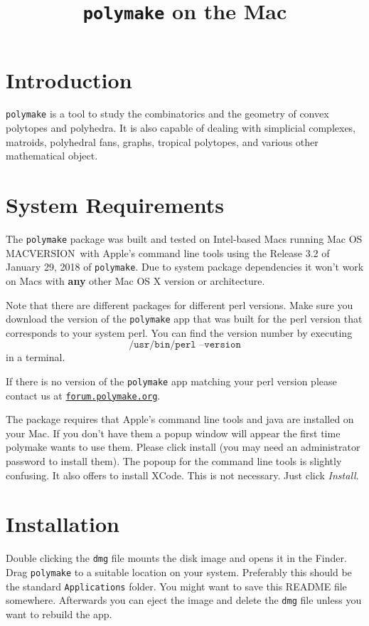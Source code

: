 \documentclass[a4paper]{amsart}
\title{\texttt{polymake} on the Mac\\\polymakeversion}
\newcommand{\macversion}{MACVERSION}
\newcommand{\polymakeversion}{Release 3.2 of January 29, 2018\xspace}
\newcommand{\polymake}{\texttt{polymake}\xspace}
\begin{document}
\maketitle
\parindent0pt

\section*{Introduction}

\polymake is a tool to study the combinatorics and the geometry of convex polytopes and polyhedra. It is also capable of dealing with simplicial complexes, matroids, polyhedral fans, graphs, tropical polytopes, and various other mathematical object.

\section*{System Requirements}

The \polymake package was built and tested on Intel-based Macs running Mac OS \macversion\ with Apple's command line tools using the \polymakeversion of \polymake. Due to system package dependencies it won't work on Macs with \textbf{any} other Mac OS X version or architecture.

Note that there are different packages for different perl versions. Make sure you download the version of the \polymake app that was built for the perl version that corresponds to your system perl. You can find the version number by executing \[\texttt{/usr/bin/perl --version}\] in a terminal.

If there is no version of the \polymake app matching your perl version please contact us at \href{http://forum.polymake.org}{\tt forum.polymake.org}.

\bigskip
The package requires that Apple's command line tools and java are installed on your Mac. If you don't have them a popup window will appear the first time polymake wants to use them. Please click install (you may need an administrator password to install them). The popoup for the command line tools is slightly confusing. It also offers to install XCode. This is not necessary. Just click \emph{Install}.

\section*{Installation}

Double clicking the \texttt{dmg} file mounts the disk image and opens it in the Finder. Drag \polymake to a suitable location on your system. Preferably this should be the standard \texttt{Applications} folder. You might want to save this README file somewhere. Afterwards you can eject the image and delete the  \texttt{dmg} file unless you want to rebuild the app.
\end{document}
